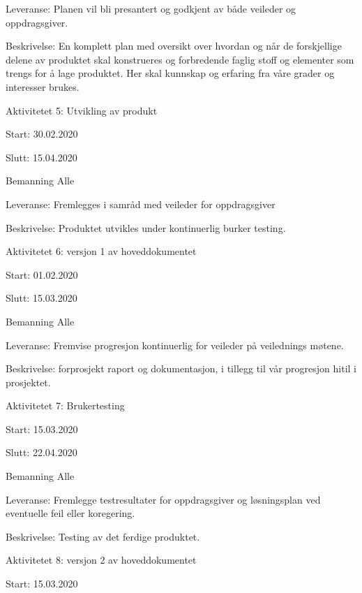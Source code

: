 \documentclass[11pt,a4paper]{report}
\begin{document}
\begin{compactdesc}
\begin{compactitem}
	\item Leveranse: Planen vil bli presantert og godkjent av både veileder og oppdragsgiver. 
	\item Beskrivelse: En komplett plan med oversikt over hvordan og når de forskjellige delene av produktet skal konstrueres og forbredende faglig stoff og elementer som trengs for å lage produktet. Her skal kunnskap og erfaring fra våre grader og interesser brukes.
	\end{compactitem}
	\item [Aktivitetet 5:] Utvikling av produkt
	\begin{compactitem}
	\item Start: 30.02.2020
	\item Slutt: 15.04.2020
	\item Bemanning Alle
	\item Leveranse: Fremlegges i samråd med veileder for oppdragsgiver 
	\item Beskrivelse: Produktet utvikles under kontinuerlig burker testing.
	\end{compactitem}
	\item [Aktivitetet 6:] versjon 1 av hoveddokumentet
	\begin{compactitem}
	\item Start: 01.02.2020
	\item Slutt: 15.03.2020
	\item Bemanning Alle
	\item Leveranse: Fremvise progresjon kontinuerlig for veileder på veilednings møtene. 
	\item Beskrivelse: forprosjekt raport og dokumentasjon, i tillegg til vår progresjon hitil i prosjektet. 
	\end{compactitem}
	\item [Aktivitetet 7:] Brukertesting
	\begin{compactitem}
	\item Start: 15.03.2020
	\item Slutt: 22.04.2020
	\item Bemanning Alle
	\item Leveranse: Fremlegge testresultater for oppdragsgiver og løsningsplan ved eventuelle feil eller koregering. 
	\item Beskrivelse: Testing av det ferdige produktet.
	\end{compactitem}
	\item [Aktivitetet 8:] versjon 2 av hoveddokumentet
	\begin{compactitem}
	\item Start: 15.03.2020

\end{compactitem}
\end{compactdesc}
\end{document}
